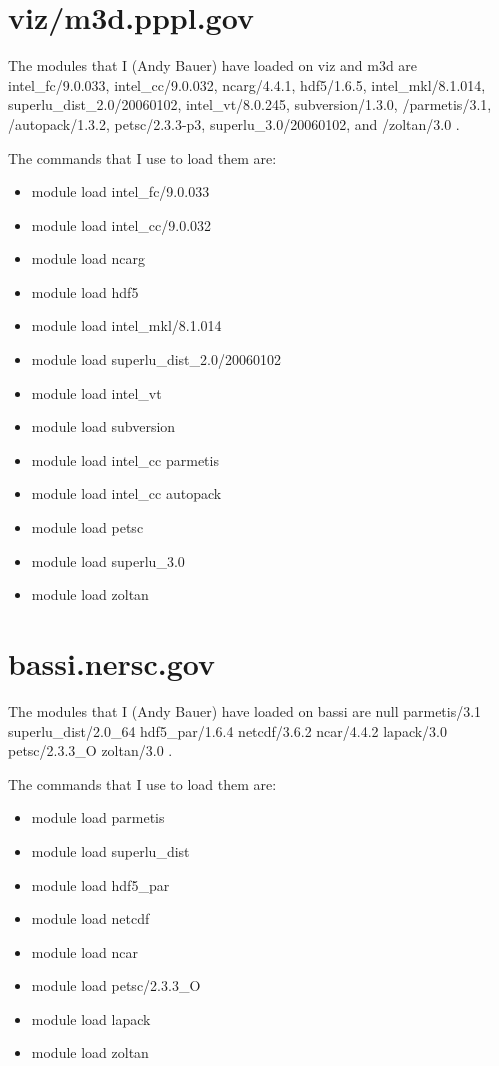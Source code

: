 \section{viz/m3d.pppl.gov}
The modules that I (Andy Bauer) have loaded on viz and m3d are  
 intel\_fc/9.0.033,
 intel\_cc/9.0.032,
 ncarg/4.4.1,
 hdf5/1.6.5,
 intel\_mkl/8.1.014,
   superlu\_dist\_2.0/20060102,
   intel\_vt/8.0.245,
   subversion/1.3.0,
   /parmetis/3.1,
  /autopack/1.3.2,
  petsc/2.3.3-p3,
  superlu\_3.0/20060102, and
  /zoltan/3.0 .

The commands that I use to load them are:
\begin{itemize}
\item      module load intel\_fc/9.0.033
\item       module load intel\_cc/9.0.032
\item       module load ncarg
\item       module load hdf5
\item       module load intel\_mkl/8.1.014
\item       module load superlu\_dist\_2.0/20060102
\item       module load intel\_vt
\item       module load subversion
\item       module load intel\_cc parmetis
\item       module load intel\_cc autopack
\item       module load petsc
\item       module load superlu\_3.0
\item       module load zoltan
\end{itemize}

\section{bassi.nersc.gov}
The modules that I (Andy Bauer) have loaded on bassi are 
null
   parmetis/3.1
   superlu\_dist/2.0\_64
   hdf5\_par/1.6.4
   netcdf/3.6.2
   ncar/4.4.2
   lapack/3.0
   petsc/2.3.3\_O
   zoltan/3.0 .

The commands that I use to load them are:
\begin{itemize}
\item module load parmetis
\item module load superlu\_dist
\item module load hdf5\_par
\item module load netcdf
\item module load ncar
\item module load petsc/2.3.3\_O
\item module load lapack
\item module load zoltan
\end{itemize}

